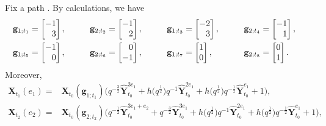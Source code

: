 \documentclass[pdftex]{sigma}
\numberwithin{equation}{section}
\begin{document}
\begin{Example}[type $G_{2}$]
Fix a path .
By calculations, we have
\begin{alignat*}{5}
 &\mathbf{g}_{1;t_{1}}=\begin{bmatrix}
 -1\\\hphantom{-}3
 \end{bmatrix}, \qquad&&
 \mathbf{g}_{2;t_{2}}=\begin{bmatrix}
 -1\\\hphantom{-}2
 \end{bmatrix},\qquad&&
 \mathbf{g}_{1;t_{3}}=\begin{bmatrix}
 -2\\\hphantom{-}3
 \end{bmatrix},\qquad&&
  \mathbf{g}_{2;t_{4}}=\begin{bmatrix}
 -1\\\hphantom{-}1
 \end{bmatrix},&\\
 &\mathbf{g}_{1;t_{5}}=\begin{bmatrix}
 -1\\\hphantom{-}0
 \end{bmatrix},\qquad&&
 \mathbf{g}_{2;t_{6}}=\begin{bmatrix}
 \hphantom{-}0\\-1
 \end{bmatrix},\qquad&&
 \mathbf{g}_{1;t_{7}}=\begin{bmatrix}
 1\\0
 \end{bmatrix},\qquad&&
 \mathbf{g}_{2;t_{8}}=\begin{bmatrix}
 0\\1
 \end{bmatrix}.&
 \end{alignat*}
Moreover,
\begin{align*}
 \mathbf{X}_{t_{1}}(e_{1})={}&\mathbf{X}_{t_{0}}(\mathbf{g}_{1;t_1})\bigl(q^{-\frac{3}{2}}\mathbf{\hat{Y}}_{t_0}^{3e_1}+h\bigl(q^{\frac{1}{2}}\bigr)q^{-1}
 \mathbf{\hat{Y}}_{t_0}^{2e_1}+h\bigl(q^{\frac{1}{2}}\bigr)q^{-\frac{1}{2}}\mathbf{\hat{Y}}_{t_0}^{e_1}+1\bigr),\\
 \mathbf{X}_{t_2}(e_2)={}&\mathbf{X}_{t_0}(\mathbf{g}_{2;t_2})\bigl(q^{-\frac{1}{2}}\mathbf{\hat{Y}}_{t_0}^{3e_1+e_2}+q^{-\frac{3}{2}}\mathbf{\hat{Y}}_{t_0}^{3e_1}
 +h\bigl(q^{\frac{1}{2}}\bigr)q^{-1}\mathbf{\hat{Y}}_{t_0}^{2e_1}+h\bigl(q^{\frac{1}{2}}\bigr)q^{-\frac{1}{2}}\mathbf{\hat{Y}}_{t_0}^{e_1}+1\bigr),\\

\end{align*}
\end{Example}
\end{document}
